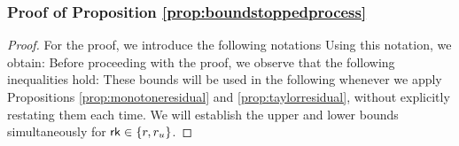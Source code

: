 \subsubsection{Proof of Proposition \ref{prop:boundstoppedprocess}}
\begin{proof}
For the proof, we introduce the following notations  
Using this notation, we obtain:
Before proceeding with the proof, we observe that  the following inequalities hold:
These bounds will be used in the following whenever we apply Propositions  \ref{prop:monotoneresidual} and \ref{prop:taylorresidual}, without explicitly restating them each time. We will establish the upper and lower bounds simultaneously for $\mathsf{rk} \in \{ r, r_u \}$.

\end{proof}
